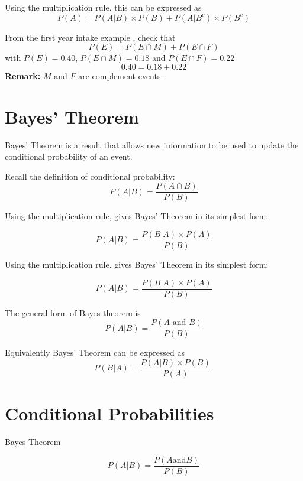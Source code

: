 \documentclass[]{report}
\begin{document}
Using the multiplication rule, this can be expressed as
\[ P(A) = P(A | B)\times P(B) + P(A | B^{c})\times P(B^{c}) \]


From the first year intake example , check that
\[ P(E)  = P(E \cap M) + P(E \cap F) \]
with $ P(E) = 0.40$, $ P(E \cap M) = 0.18$ and  $ P(E \cap F) = 0.22$
\[ 0.40  = 0.18 + 0.22 \]
\textbf{Remark:}  $M$ and $F$ are complement events.


\section{Bayes' Theorem}
Bayes' Theorem is a result that allows new information to be used to update the conditional probability of an event.
\bigskip

Recall the definition of conditional probability:
\[ P(A|B) = \frac{P(A \cap B)}{P(B)} \]


Using the multiplication rule, gives Bayes' Theorem in its simplest form:

\[ P(A|B) = \frac{P(B|A)\times P(A)}{P(B)} \]



Using the multiplication rule, gives Bayes' Theorem in its simplest form:

\[ P(A|B) = \frac{P(B|A)\times P(A)}{P(B)} \]


The general form of Bayes theorem is
\[ P(A|B) =
\frac{P(A \mbox{ and }B)}{P(B)} \]

Equivalently Bayes' Theorem can be expressed as
\begin{equation*}
P(B|A)=\frac{P\left(A|B\right) \times P(B) }{P\left( A\right) }.
\end{equation*}





\section{Conditional Probabilities}
Bayes Theorem


\[ P(A|B)  = \frac{P(A \mbox{and} B)}{P(B)} \]
\end{document}
